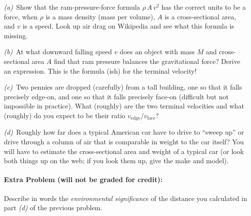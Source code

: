 \documentclass[12pt]{article}
\begin{document}
\textsl{(a)}~Show that the ram-pressure-force formula $\rho\,A\,v^2$ has the
correct units to be a force, when $\rho$ is a mass density (mass per volume),
$A$ is a cross-sectional area, and $v$ is a speed. Look up air drag on
Wikipedia and see what this formula is missing.

\textsl{(b)}~At what downward falling speed $v$ does an object with
mass $M$ and cross-sectional area $A$ find that ram pressure balances
the gravitational force? Derive an expression. This is the formula
(ish) for the terminal velocity!

\textsl{(c)}~Two pennies are dropped (carefully) from a tall building,
one so that it falls precisely edge-on, and one so that it falls
precisely face-on (difficult but not impossible in practice).  What
(roughly) are the two terminal velocities and what (roughly) do you expect to be
their ratio $v_{\mathrm{edge}}/v_{\mathrm{face}}$?

\textsl{(d)}~Roughly how far does a typical American car have to drive
to ``sweep up'' or drive through a column of air that is comparable in
weight to the car itself?  You will have to estimate the
cross-sectional area and weight of a typical car (or look both things
up on the web; if you look them up, give the make and model).

\paragraph{Extra Problem (will not be graded for credit):}%
Describe in words the \emph{environmental significance} of the
distance you calculated in part \textsl{(d)} of the previous problem.
\end{document}
